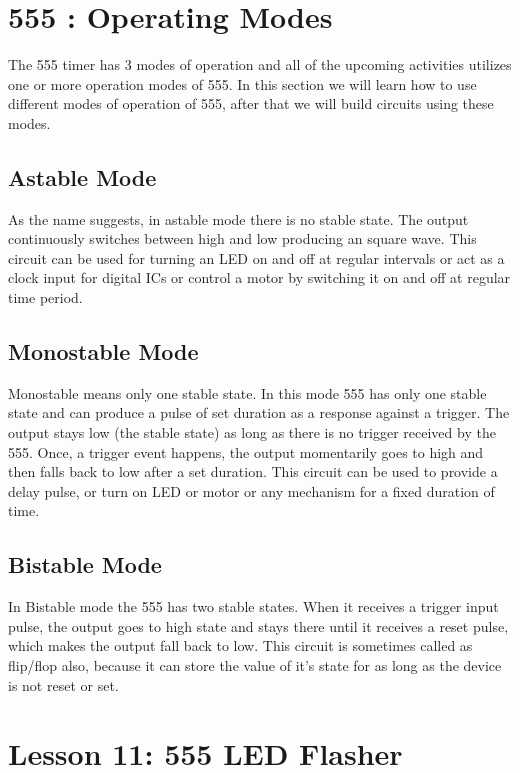 \section{555 : Operating Modes}
The 555 timer has 3 modes of operation and all of the upcoming activities utilizes one or more operation modes of 555.
In this section we will learn how to use different modes of operation of 555, after that we will build circuits using these modes.
\subsection{Astable Mode}
As the name suggests, in astable mode there is no stable state. The output continuously switches between high and low producing an
square wave. This circuit can be used for turning an LED on and off at regular intervals or act as a clock input for digital ICs
or control a motor by switching it on and off at regular time period.
\subsection{Monostable Mode}
Monostable means only one stable state. In this mode 555 has only one stable state and can produce a pulse of set duration as a 
response against a trigger. The output stays low (the stable state) as long as there is no trigger received by the 555. Once, a
trigger event happens, the output momentarily goes to high and then falls back to low after a set duration. This circuit can be 
used to provide a delay pulse, or turn on LED or motor or any mechanism for a fixed duration of time.
\subsection{Bistable Mode}
In Bistable mode the 555 has two stable states. When it receives a trigger input pulse, the output goes to high state and stays there 
until it receives a reset pulse, which makes the output fall back to low. This circuit is sometimes called as flip/flop also, because 
it can store the value of it's state for as long as the device is not reset or set.

\clearpage

\section{Lesson 11: 555 LED Flasher}
